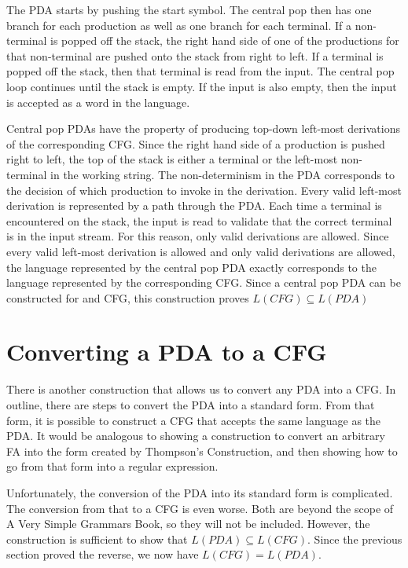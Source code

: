 \documentclass[letterpaper,12pt,openany,reqno]{book}%
\begin{document}
The PDA starts by pushing the start symbol. The central pop then has one branch for each production as well as one branch for each terminal. If a non-terminal is popped off the stack, the right hand side of one of the productions for that non-terminal are pushed onto the stack from right to left. If a terminal is popped off the stack, then that terminal is read from the input. The central pop loop continues until the stack is empty. If the input is also empty, then the input is accepted as a word in the language.

Central pop PDAs have the property of producing top-down left-most derivations of the corresponding CFG. Since the right hand side of a production is pushed right to left, the top of the stack is either a terminal or the left-most non-terminal in the working string. The non-determinism in the PDA corresponds to the decision of which production to invoke in the derivation. Every valid left-most derivation is represented by a path through the PDA. Each time a terminal is encountered on the stack, the input is read to validate that the correct terminal is in the input stream. For this reason, only valid derivations are allowed. Since every valid left-most derivation is allowed and only valid derivations are allowed, the language represented by the central pop PDA exactly corresponds to the language represented by the corresponding CFG. Since a central pop PDA can be constructed for and CFG, this construction proves $L(CFG) \subseteq L(PDA)$

\section{Converting a PDA to a CFG}
There is another construction that allows us to convert any PDA into a CFG. In outline, there are steps to convert the PDA into a standard form. From that form, it is possible to construct a CFG that accepts the same language as the PDA. It would be analogous to showing a construction to convert an arbitrary FA into the form created by Thompson's Construction, and then showing how to go from that form into a regular expression.

Unfortunately, the conversion of the PDA into its standard form is complicated. The conversion from that to a CFG is even worse. Both are beyond the scope of A Very Simple Grammars Book, so they will not be included. However, the construction is sufficient to show that $L(PDA) \subseteq L(CFG)$. Since the previous section proved the reverse, we now have $L(CFG) = L(PDA)$.
\end{document}

